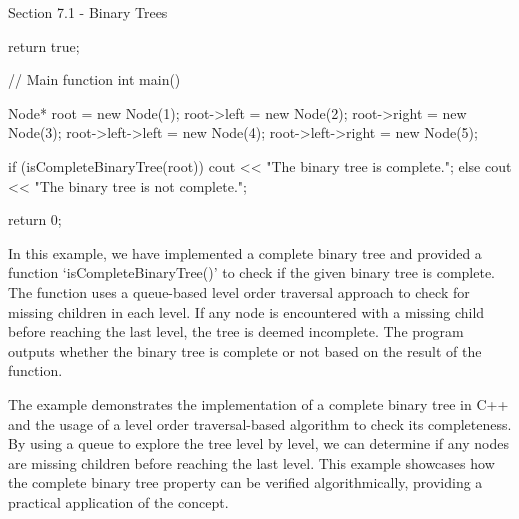 \begin{notes}{Section 7.1 - Binary Trees}
\begin{highlight}
\begin{code}[C++]
{        return true;
    }
    
    // Main function
    int main() {
        Node* root = new Node(1);
        root->left = new Node(2);
        root->right = new Node(3);
        root->left->left = new Node(4);
        root->left->right = new Node(5);
        
        if (isCompleteBinaryTree(root))
            cout << "The binary tree is complete.";
        else
            cout << "The binary tree is not complete.";
        
        return 0;
    }
    \end{code}
        In this example, we have implemented a complete binary tree and provided a function `isCompleteBinaryTree()' to check if the given binary tree is complete. The function uses a queue-based level order traversal approach to check for missing children in each level. If any node is encountered with a missing child before reaching the last level, 
        the tree is deemed incomplete. The program outputs whether the binary tree is complete or not based on the result of the function.
    
        The example demonstrates the implementation of a complete binary tree in C++ and the usage of a level order traversal-based algorithm to check its completeness. By using a queue to explore the tree level by level, we can determine if any nodes are missing children before reaching the last level. This example showcases how 
        the complete binary tree property can be verified algorithmically, providing a practical application of the concept.
    \end{highlight}
\end{notes}

